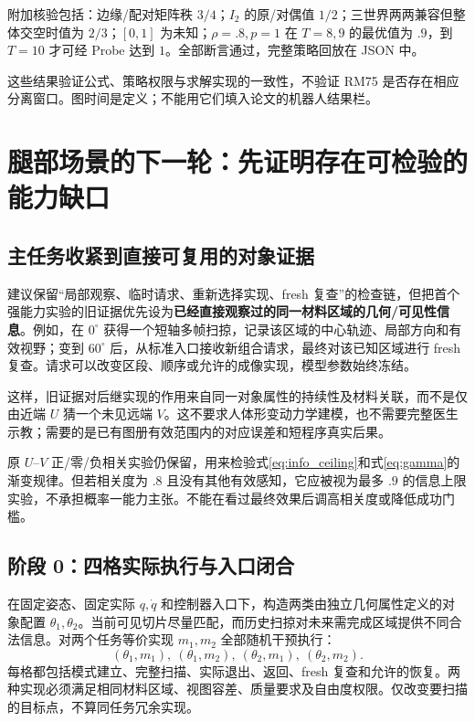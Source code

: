 \documentclass[11pt,a4paper,fontset=fandol]{ctexart}
\theoremstyle{definition}
\theoremstyle{remark}\newtheorem{remark}[theorem]{说明}
\numberwithin{equation}{section}
\begin{document}
附加核验包括：边缘/配对矩阵秩 $3/4$；$I_2$ 的原/对偶值 $1/2$；三世界两两兼容但整体交空时值为 $2/3$；$[0,1]$ 为未知；$\rho=.8,p=1$ 在 $T=8,9$ 的最优值为 $.9$，到 $T=10$ 才可经 Probe 达到 $1$。全部断言通过，完整策略回放在 JSON 中。

这些结果验证公式、策略权限与求解实现的一致性，不验证 RM75 是否存在相应分离窗口。图时间是定义；不能用它们填入论文的机器人结果栏。

\section{腿部场景的下一轮：先证明存在可检验的能力缺口}
\label{sec:experiment}
\subsection{主任务收紧到直接可复用的对象证据}
建议保留“局部观察、临时请求、重新选择实现、fresh 复查”的检查链，但把首个强能力实验的旧证据优先设为\textbf{已经直接观察过的同一材料区域的几何/可见性信息}。例如，在 $0^\circ$ 获得一个短轴多帧扫掠，记录该区域的中心轨迹、局部方向和有效视野；变到 $60^\circ$ 后，从标准入口接收新组合请求，最终对该已知区域进行 fresh 复查。请求可以改变区段、顺序或允许的成像实现，模型参数始终冻结。

这样，旧证据对后继实现的作用来自同一对象属性的持续性及材料关联，而不是仅由近端 $U$ 猜一个未见远端 $V$。这不要求人体形变动力学建模，也不需要完整医生示教；需要的是已有图册有效范围内的对应误差和短程序真实后果。

原 $U$--$V$ 正/零/负相关实验仍保留，用来检验式\eqref{eq:info_ceiling}和式\eqref{eq:gamma}的渐变规律。但若相关度为 $.8$ 且没有其他有效感知，它应被视为最多 $.9$ 的信息上限实验，不承担概率一能力主张。不能在看过最终效果后调高相关度或降低成功门槛。

\subsection{阶段 0：四格实际执行与入口闭合}
在固定姿态、固定实际 $q,\dot q$ 和控制器入口下，构造两类由独立几何属性定义的对象配置 $\theta_1,\theta_2$。当前可见切片尽量匹配，而历史扫掠对未来需完成区域提供不同合法信息。对两个任务等价实现 $m_1,m_2$ 全部随机干预执行：
\begin{equation}
 (\theta_1,m_1),\ (\theta_1,m_2),\ (\theta_2,m_1),\ (\theta_2,m_2).
 \label{eq:four_physical}
\end{equation}
每格都包括模式建立、完整扫描、实际退出、返回、fresh 复查和允许的恢复。两种实现必须满足相同材料区域、视图容差、质量要求及自由度权限。仅改变要扫描的目标点，不算同任务冗余实现。
\end{document}

